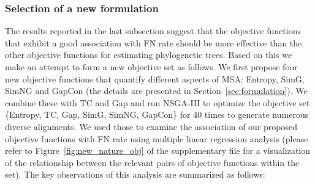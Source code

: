 \subsubsection{Selection of a new formulation}
\label{sec:new_msa_formulation}
The results reported in the last subsection suggest that the objective functions that exhibit a good association with FN rate should be more effective than the other objective functions for estimating phylogenetic trees. Based on this we make an attempt to form a new objective set as follows. We first propose four new objective functions that quantify different aspects of MSA: Entropy, SimG, SimNG and GapCon (the details are presented in Section~\ref{sec:formulation}). We combine these with TC and Gap and run NSGA-III to optimize the objective set \{Entropy, TC, Gap, SimG, SimNG, GapCon\} for 40 times to generate numerous diverse alignments. We used those to examine the association of our proposed objective functions with FN rate using multiple linear regression analysis (please refer to Figure~\ref{fig:new_nature_obj} of the supplementary file for a visualization of the relationship between the relevant pairs of objective functions within the set). The key observations of this analysis are summarized as follows: 

